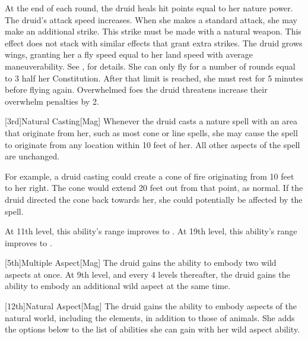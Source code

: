         At the end of each round, the druid heals hit points equal to her nature power.
        The druid's attack speed increases.
        When she makes a standard attack, she may make an additional strike.
        This strike must be made with a natural weapon.
        This effect does not stack with similar effects that grant extra strikes.
        The druid grows wings, granting her a fly speed equal to her land speed with average maneuverability.
        See , for details.
        She can only fly for a number of rounds equal to 3 \add half her Constitution.
        After that limit is reached, she must rest for 5 minutes before flying again.
        Overwhelmed foes the druid threatens increase their overwhelm penalties by 2.

        [3rd]{Natural Casting}[Mag]
        Whenever the druid casts a nature spell with an area that originate from her, such as most cone or line spells, she may cause the spell to originate from any location within 10 feet of her.
        All other aspects of the spell are unchanged.

        For example, a druid casting  could create a cone of fire originating from 10 feet to her right.
        The cone would extend 20 feet out from that point, as normal.
        If the druid directed the cone back towards her, she could potentially be affected by the spell.

        At 11th level, this ability's range improves to \rngclose.
        At 19th level, this ability's range improves to \rngmed.

        [5th]{Multiple Aspect}[Mag]
        The druid gains the ability to embody two wild aspects at once.
        At 9th level, and every 4 levels thereafter, the druid gains the ability to embody an additional wild aspect at the same time.

        [12th]{Natural Aspect}[Mag]
        The druid gains the ability to embody aspects of the natural world, including the elements, in addition to those of animals.
        She adds the options below to the list of abilities she can gain with her wild aspect ability.

